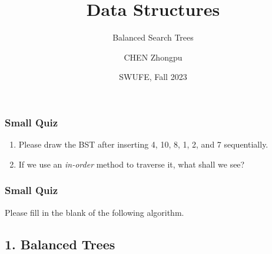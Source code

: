 \documentclass[aspectratio=169, 14pt]{beamer}
\title[Data Structures] %
{Data Structures}
\subtitle{Balanced Search Trees}
\author[CHEN Zhongpu] %
{CHEN Zhongpu}
\institute[] %
{
	School of Computing and Artificial Intelligence \\
	\href{mailto:zpchen@swufe.edu.cn}{zpchen@swufe.edu.cn}
}
\date[] %
{SWUFE, Fall 2023}
\begin{document}
\frame{\titlepage}

\begin{frame}
	\frametitle{Small Quiz}
	\begin{enumerate}
		\item Please draw the BST after inserting 4, 10, 8, 1, 2, and 7 sequentially.
		\item If we use an \emph{in-order} method to traverse it, what shall we see?
	\end{enumerate}

\end{frame}

\begin{frame}
	\frametitle{Small Quiz}

	Please fill in the blank of the following algorithm.



\end{frame}

{
\begin{frame}
	\section{\textcolor{darkmidnightblue}{1. Balanced Trees}}
\end{frame}

}
\end{document}
